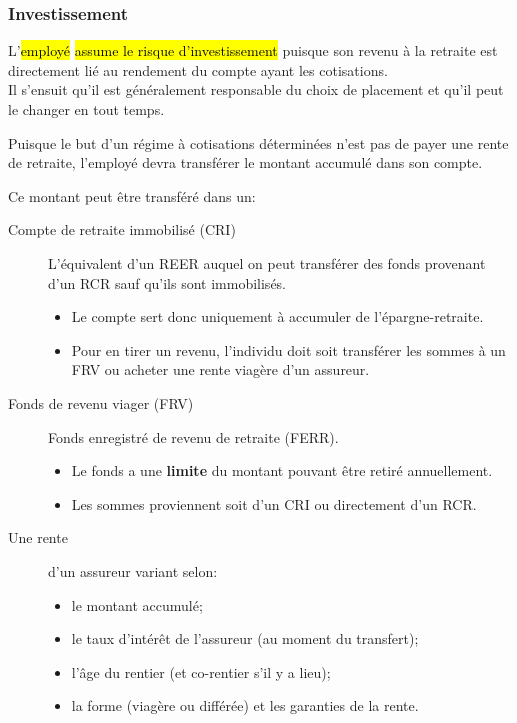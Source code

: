 \documentclass[10pt, french]{article}
\begin{document}
\begin{multicols*}{3}
\subsubsection*{Investissement}

L'\hl{employé} \hl{assume le risque d'investissement} puisque son revenu à la retraite est directement lié au rendement du compte ayant les cotisations. \\

Il s'ensuit 	qu'il est généralement responsable du choix de placement et qu'il peut le changer en tout temps.

Puisque le but d'un régime à cotisations déterminées n'est pas de payer une rente de retraite, l'employé devra transférer le montant accumulé dans son compte.

\begin{definitionNOHFILLsub}
Ce montant peut être transféré dans un:
\begin{description}
	\item[Compte de retraite immobilisé (CRI)]	L'équivalent d'un REER auquel on peut transférer des fonds provenant d'un RCR sauf qu'ils sont immobilisés.
		\begin{itemize}[leftmargin = *]
		\item	Le compte sert donc uniquement à accumuler de l'épargne-retraite.
		\item	Pour en tirer un revenu, l'individu doit soit transférer les sommes à un FRV ou acheter une rente viagère d'un assureur.
		\end{itemize}
	\item[Fonds de revenu viager (FRV)]	Fonds enregistré de revenu de retraite (FERR).
		\begin{itemize}[leftmargin = *]
		\item	Le fonds a une \textbf{limite} du montant pouvant être retiré annuellement.
		\item	Les sommes proviennent soit d'un CRI ou directement d'un RCR.
		\end{itemize}
	\item[Une rente]d'un assureur variant selon:
		\begin{itemize}[leftmargin = *]
		\item	le montant accumulé;
		\item	le taux d'intérêt de l'assureur (au moment du transfert);
		\item	l'âge du rentier (et co-rentier s'il y a lieu);
		\item	la forme (viagère ou différée) et les garanties de la rente.
		\end{itemize}
\end{description}
\end{definitionNOHFILLsub}


\end{multicols*}
\end{document}
